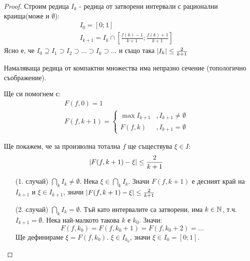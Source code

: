 \begin{proof}
    Строим редица $I_k$ - редица от затворени интервали с рационални краища(може и $\emptyset$):
    \begin{equation}
        \begin{split}
            I_0 = [0; 1] \\
            I_{k+1} = I_k \cap \left[ \frac{f(k)- 1}{k+1}; \frac{f(k) + 1}{k+1} \right]
        \end{split}
    \end{equation}
    Ясно е, че $I_0 \supseteq I_1 \supset I_2 \supset \dots \supset I_k \supset \dots$ и също така $\left|I_k\right| \leq \frac{2}{k+1}$

    Намаляваща редица от компактни множества има непразно сечение (топологично съображение).

    Ще си помогнем с:
    \begin{equation}
        \begin{split}
            F(f, 0) = 1\\
            F(f, k+1) = \begin{cases}
                \max I_{k+1} &, I_{k+1} \neq \emptyset \\
                F(f, k) &, I_{k+1} = \emptyset
            \end{cases}
        \end{split}
    \end{equation}
    
    Ще покажем, че за произволна тотална $f$ ще съществува $\xi \in I$:
    \begin{equation}
        \left|F(f, k+1) - \xi\right| \leq \frac{2}{k+1}
    \end{equation}
    \begin{itemize}
        \item[(1. случай)] $\bigcap_k I_k \neq \emptyset$. Нека $\xi \in \bigcap_k I_k$. Значи $F(f, k+1)$ е десният край на $I_{k+1}$ и $\xi \in I_{k+1}$, значи $\left|F(f, k+1) - \xi\right| \leq \frac{2}{k+1}$
        \item[(2. случай)] $\bigcap_k I_k = \emptyset$. Тъй като интервалите са затворени, има $k \in {\mathbb{N}}$, т.ч. $I_{k+1} = \emptyset$. Нека най-малкото такова $k$ е $k_0$. Значи:
        \begin{equation}
            F(f, k_0) = F(f, k_0 + 1) = F(f, k_0 + 2) = \dots
        \end{equation}
        Ще дефинираме $\xi = F(f, k_0)$. $\xi \in I_{k_0}$, значи $\xi \in I_0 = [0; 1]$. 


\end{itemize}
\end{proof}
